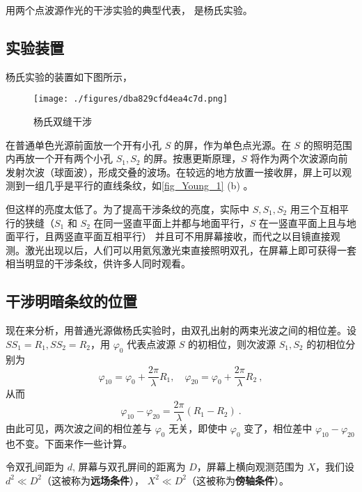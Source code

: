 

用两个点波源作光的干涉实验的典型代表， 是杨氏实验。
\subsection{实验装置}
杨氏实验的装置如下图所示，
\begin{figure}[ht]
\centering
\texttt{[image: ./figures/dba829cfd4ea4c7d.png]}
\caption{杨氏双缝干涉} \label{fig_Young_1}
\end{figure}
在普通单色光源前面放一个开有小孔 $S$ 的屏，作为单色点光源。在 $S $ 的照明范围内再放一个开有两个小孔 $S_1,S_2$ 的屏。按惠更斯原理，$S$ 将作为两个次波源向前发射次波（球面波），形成交叠的波场。在较远的地方放置一接收屏，屏上可以观测到一组几乎是平行的直线条纹，如\autoref{fig_Young_1} (b) 。

但这样的亮度太低了。为了提高干涉条纹的亮度，实际中 $S,S_1,S_2$ 用三个互相平行的狭缝（$S_1$ 和 $S_2$ 在同一竖直平面上并都与地面平行，$S$ 在一竖直平面上且与地面平行，且两竖直平面互相平行）
并且可不用屏幕接收，而代之以目镜直接观测。激光出现以后，人们可以用氦氖激光束直接照明双孔，在屏幕上即可获得一套相当明显的干涉条纹，供许多人同时观看。

\subsection{干涉明暗条纹的位置}
现在来分析，用普通光源做杨氏实验时，由双孔出射的两束光波之间的相位差。设 $SS_1=R_1,SS_2=R_2$，用 $\varphi_0$ 代表点波源 $S$ 的初相位，则次波源 $S_1,S_2$ 的初相位分别为
\begin{equation}
\varphi_{10}=\varphi_{0}+\frac{2 \pi}{\lambda} R_{1}, \quad \varphi_{20}=\varphi_{0}+\frac{2 \pi}{\lambda} R_{2}~,
\end{equation}
从而
\begin{equation}
\varphi_{10}-\varphi_{20}=\frac{2 \pi}{\lambda}\left(R_{1}-R_{2}\right)~.
\end{equation}
由此可见，两次波之间的相位差与 $\varphi_0$ 无关，即使中 $\varphi_0$ 变了，相位差中 $\varphi_{10}-\varphi_{20}$ 也不变。下面来作一些计算。

令双孔间距为 $d$, 屏幕与双孔屏间的距离为 $D$，屏幕上横向观测范围为 $X$，我们设 $d^{2} \ll D^{2}$（这被称为\textbf{远场条件}）， $X^{2} \ll D^{2}$（这被称为\textbf{傍轴条件}）。

